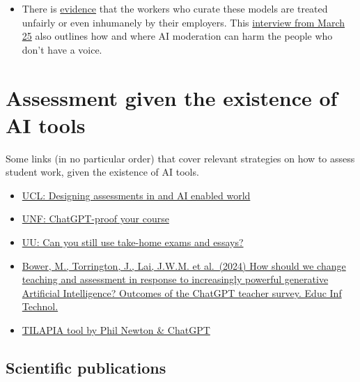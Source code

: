 \documentclass[
  letterpaper,
  DIV=11,
  numbers=noendperiod]{scrreprt}
\providecommand{\tightlist}{%
  \setlength{\itemsep}{0pt}\setlength{\parskip}{0pt}}\usepackage{longtable,booktabs,array}
\begin{document}
\begin{itemize}
\tightlist
\item
  There is
  \href{https://time.com/6247678/openai-chatgpt-kenya-workers/}{evidence}
  that the workers who curate these models are treated unfairly or even
  inhumanely by their employers. This
  \href{https://blogs.lse.ac.uk/businessreview/2024/03/25/madhumita-murgia-ai-can-do-harm-when-people-dont-have-a-voice/}{interview
  from March 25} also outlines how and where AI moderation can harm the
  people who don't have a voice.
\end{itemize}

\section{Assessment given the existence of AI
tools}\label{assessment-given-the-existence-of-ai-tools}

Some links (in no particular order) that cover relevant strategies on
how to assess student work, given the existence of AI tools.

\begin{itemize}
\tightlist
\item
  \href{https://www.ucl.ac.uk/teaching-learning/generative-ai-hub/designing-assessments-ai-enabled-world}{UCL:
  Designing assessments in and AI enabled world}
\item
  \href{https://unf.pressbooks.pub/chatgptinhighereducation/chapter/chatgpt-proof-your-course/}{UNF:
  ChatGPT-proof your course}
\item
  \href{https://www.uu.nl/en/education/educational-development-training/knowledge-dossier/the-influence-of-chatgpt-on-assessment-can-you-still-use-take-home-exams-and-essays}{UU:
  Can you still use take-home exams and essays?}
\item
  \href{https://link.springer.com/article/10.1007/s10639-023-12405-0}{Bower,
  M., Torrington, J., Lai, J.W.M. et al.~(2024) How should we change
  teaching and assessment in response to increasingly powerful
  generative Artificial Intelligence? Outcomes of the ChatGPT teacher
  survey. Educ Inf Technol.}
\item
  \href{https://www.dropbox.com/scl/fi/a0knbe4l5vdmpr9l2xsox/AI-resilience-tool-v3.0.png?rlkey=ih87d4jh5lqu9l69ygr44s2se&dl=0}{TILAPIA
  tool by Phil Newton \& ChatGPT}
\end{itemize}

\subsection{Scientific publications}\label{scientific-publications}
\end{document}
